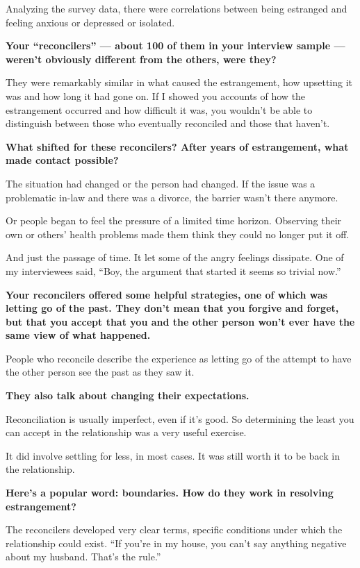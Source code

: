 Analyzing the survey data, there were correlations between being
estranged and feeling anxious or depressed or isolated.

\textbf{Your ``reconcilers'' --- about 100 of them in your interview
sample --- weren't obviously different from the others, were they?}

They were remarkably similar in what caused the estrangement, how
upsetting it was and how long it had gone on. If I showed you accounts
of how the estrangement occurred and how difficult it was, you wouldn't
be able to distinguish between those who eventually reconciled and those
that haven't.

\textbf{What shifted for these reconcilers? After years of estrangement,
what made contact possible?}

The situation had changed or the person had changed. If the issue was a
problematic in-law and there was a divorce, the barrier wasn't there
anymore.

Or people began to feel the pressure of a limited time horizon.
Observing their own or others' health problems made them think they
could no longer put it off.

And just the passage of time. It let some of the angry feelings
dissipate. One of my interviewees said, ``Boy, the argument that started
it seems so trivial now.''

\textbf{Your reconcilers offered some helpful strategies, one of which
was letting go of the past. They don't mean that you forgive and forget,
but that you accept that you and the other person won't ever have the
same view of what happened.}

People who reconcile describe the experience as letting go of the
attempt to have the other person see the past as they saw it.

\textbf{They also talk about changing their expectations.}

Reconciliation is usually imperfect, even if it's good. So determining
the least you can accept in the relationship was a very useful exercise.

It did involve settling for less, in most cases. It was still worth it
to be back in the relationship.

\textbf{Here's a popular word: boundaries. How do they work in resolving
estrangement?}

The reconcilers developed very clear terms, specific conditions under
which the relationship could exist. ``If you're in my house, you can't
say anything negative about my husband. That's the rule.''

